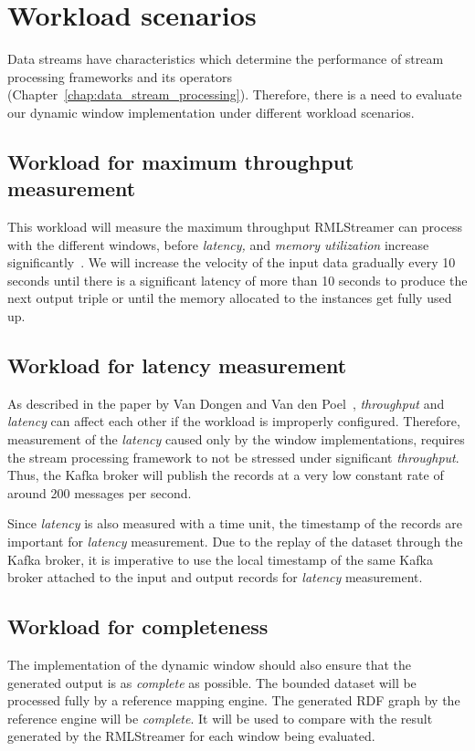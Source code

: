 \section{Workload scenarios}
Data streams have characteristics 
which determine the performance of stream processing frameworks and its 
operators (Chapter~\ref{chap:data_stream_processing}). Therefore, 
there is a need to evaluate our dynamic window implementation under different workload scenarios. 

\subsection{Workload for maximum throughput measurement}
This workload will measure the maximum throughput RMLStreamer can 
process with the different windows, before \emph{latency,} and \emph{memory utilization}
increase significantly~\cite{benchmark_dsdps}. We will increase the velocity of the input data gradually 
every 10 seconds until there is a significant latency of more than 10 seconds to produce
the next output triple or until the memory allocated to the instances get fully used up. 


\subsection{Workload for latency measurement}
As described in the paper by Van Dongen and Van den Poel~\cite{evalution_of_spe}, 
\emph{throughput} and \emph{latency} can affect each other if the workload is 
improperly configured. Therefore, measurement of the \emph{latency} caused only 
by the window implementations, requires the stream processing framework to not be 
stressed under significant \emph{throughput}. Thus, the Kafka broker will 
publish the records at a very low constant rate of around 200 messages per second. 

Since \emph{latency} is also measured with a time unit, the timestamp of the 
records are important for \emph{latency} measurement. Due to the replay of the dataset 
through the Kafka broker, it is imperative to use the local timestamp of the same Kafka broker
attached to the input and output records for \emph{latency} 
measurement\cite{latency_measurement_kafka}.


\subsection{Workload for completeness}
The implementation of the dynamic window should also ensure that the generated 
output is as \emph{complete} as possible. The bounded dataset will be processed fully by 
a reference mapping engine. The generated RDF graph by the reference 
engine will be \emph{complete}. It will be used to compare with the result 
generated by the RMLStreamer for each window being evaluated. 

